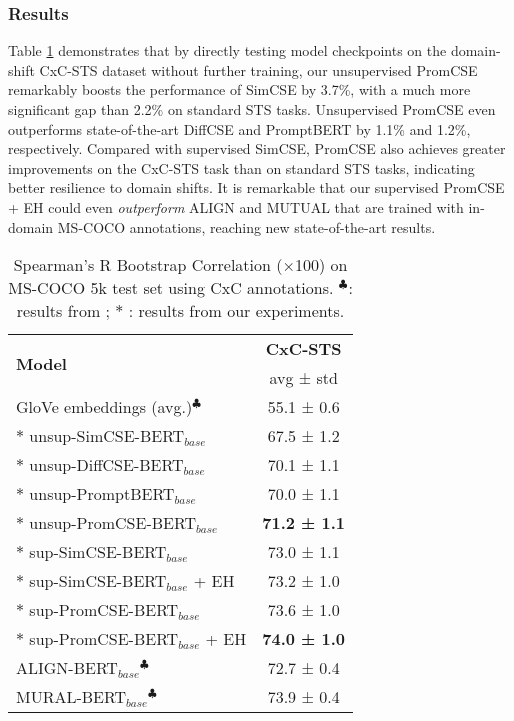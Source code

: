 \documentclass[11pt]{article}
\begin{document}
\subsubsection{Results}
Table \ref{tab: transfer sts} demonstrates that by directly testing model checkpoints on the domain-shift CxC-STS dataset without further training, our unsupervised PromCSE remarkably boosts the performance of SimCSE by 3.7\%, with a much more significant gap than 2.2\% on standard STS tasks. Unsupervised PromCSE even outperforms state-of-the-art DiffCSE and PromptBERT by 1.1\% and 1.2\%, respectively.
Compared with supervised SimCSE, PromCSE also achieves greater improvements on the CxC-STS task than on standard STS tasks, indicating better resilience to domain shifts.
It is remarkable that our supervised PromCSE + EH could even \emph{outperform} ALIGN and MUTUAL that are trained with in-domain MS-COCO annotations, reaching new state-of-the-art results.


\begin{table}[t]
\small
\centering
\begin{tabular}{lc}
\toprule
\multirow{2}{*}{\textbf{Model}}             & \textbf{CxC-STS}    \\
                                   & avg ± std  \\
\midrule
GloVe embeddings (avg.)$^\clubsuit$            & 55.1 ± 0.6   \\
$*$ unsup-SimCSE-BERT$_{base}$              & 67.5 ± 1.2 \\
$*$ unsup-DiffCSE-BERT$_{base}$             & 70.1 ± 1.1 \\
$*$ unsup-PromptBERT$_{base}$               & 70.0 ± 1.1 \\
$*$ unsup-PromCSE-BERT$_{base}$            & \textbf{71.2 ± 1.1} \\
\midrule
$*$ sup-SimCSE-BERT$_{base}$                & 73.0 ± 1.1 \\
$*$ sup-SimCSE-BERT$_{base}$ + EH  & 73.2 ± 1.0 \\
$*$ sup-PromCSE-BERT$_{base}$               & 73.6 ± 1.0 \\
$*$ sup-PromCSE-BERT$_{base}$ + EH & \textbf{74.0 ± 1.0} \\
\midrule
ALIGN-BERT$_{base}$$^\clubsuit$                         & 72.7 ± 0.4 \\
MURAL-BERT$_{base}$$^\clubsuit$                         & 73.9 ± 0.4 \\
\bottomrule
\end{tabular}
\caption{\label{tab: transfer sts}
Spearman’s R Bootstrap Correlation (×100) on MS-COCO 5k test set using CxC annotations. $^\clubsuit$: results from \cite{jain-etal-2021-mural-multimodal}; $*$ : results from our experiments.
}
\end{table}
\end{document}

